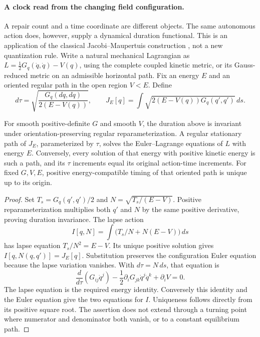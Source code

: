\paragraph{A clock read from the changing field configuration.}
A repair count and a time coordinate are different objects. The same
autonomous action does, however, supply a dynamical duration functional.
This is an application of the classical Jacobi--Maupertuis construction
\cite{Gryb2010}, not a new quantization rule. Write a natural mechanical
Lagrangian as \(L=\tfrac12G_q(\dot q,\dot q)-V(q)\), using the complete
coupled kinetic metric, or its Gauss-reduced metric on an admissible
horizontal path. Fix an energy \(E\) and an oriented regular path in the
open region \(V<E\). Define
\begin{equation}
 d\tau=\sqrt{\frac{G_q(dq,dq)}{2(E-V(q))}},\qquad
 J_E[q]=\int\sqrt{2(E-V(q))G_q(q',q')}\,ds.
 \label{eq:whitney-ephemeris-clock}
\end{equation}

\begin{proposition}
\label{prop:whitney-ephemeris-clock}
For smooth positive-definite \(G\) and smooth \(V\), the duration above
is invariant under orientation-preserving regular reparameterization.
A regular stationary path of \(J_E\), parameterized by \(\tau\), solves
the Euler--Lagrange equations of \(L\) with energy \(E\). Conversely,
every solution of that energy with positive kinetic energy is such a path,
and its \(\tau\) increments equal its original action-time increments.
For fixed \(G,V,E\), positive energy-compatible timing of that oriented
path is unique up to its origin.
\end{proposition}
\begin{proof}
Set \(T_s=G_q(q',q')/2\) and \(N=\sqrt{T_s/(E-V)}\).
Positive reparameterization multiplies both \(q'\) and \(N\) by
the same positive derivative, proving duration invariance. The lapse action
\[
 I[q,N]=\int\bigl(T_s/N+N(E-V)\bigr)\,ds
\]
has lapse equation \(T_s/N^2=E-V\). Its unique positive solution gives
\(I[q,N(q,q')]=J_E[q]\). Substitution preserves the configuration
Euler equation because the lapse variation vanishes. With
\(d\tau=N\,ds\), that equation is
\[
 \frac{d}{d\tau}(G_{ij}\dot q^j)
 -\frac12\partial_iG_{jk}\dot q^j\dot q^k+\partial_iV=0.
\]
The lapse equation is the required energy identity. Conversely this
identity and the Euler equation give the two equations for \(I\).
Uniqueness follows directly from its positive square root. The assertion
does not extend through a turning point where numerator and denominator
both vanish, or to a constant equilibrium path.
\end{proof}

